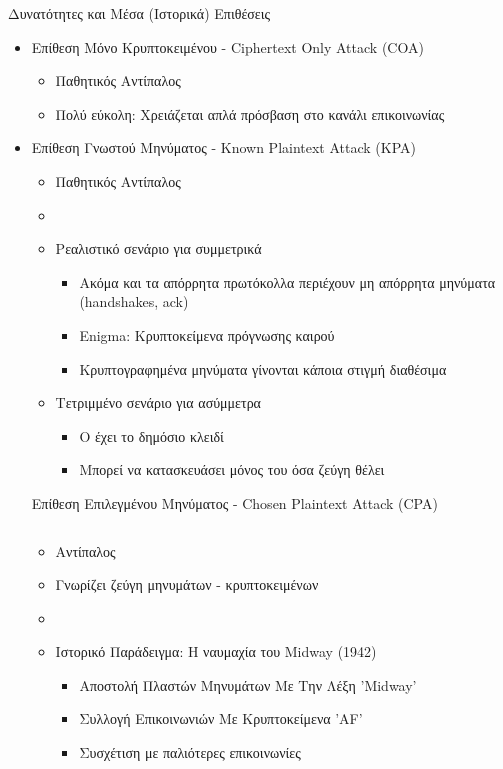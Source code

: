 \documentclass[handout]{beamer}
\begin{document}
\begin{frame}[allowframebreaks]{Δυνατότητες και Μέσα (Ιστορικά)}
Επιθέσεις
\begin{itemize}
\item Επίθεση Μόνο Κρυπτοκειμένου - Ciphertext Only Attack (COA)
\begin{itemize}
\item Παθητικός Αντίπαλος
\item Πολύ εύκολη: Χρειάζεται απλά πρόσβαση στο κανάλι επικοινωνίας
\end{itemize}
\framebreak
\item Επίθεση Γνωστού Μηνύματος -  Known Plaintext Attack (KPA)
\begin{itemize}
\item Παθητικός Αντίπαλος
\item {}
\item Ρεαλιστικό σενάριο για συμμετρικά
\begin{itemize}
\item Ακόμα και τα απόρρητα πρωτόκολλα περιέχουν μη απόρρητα μηνύματα (handshakes, ack)
\item Enigma: Κρυπτοκείμενα πρόγνωσης καιρού
\item Κρυπτογραφημένα μηνύματα γίνονται κάποια στιγμή διαθέσιμα
\end{itemize} 
\pause
\item Τετριμμένο σενάριο για ασύμμετρα
\begin{itemize}
\item O \adv έχει το δημόσιο κλειδί
\item Μπορεί να κατασκευάσει μόνος του όσα ζεύγη θέλει
\end{itemize}
\end{itemize}
\framebreak

Επίθεση Επιλεγμένου Μηνύματος - Chosen Plaintext Attack (CPA)
\begin{columns}

\begin{column}{0.65\textwidth}
\begin{itemize}
\item {} Αντίπαλος
\item Γνωρίζει ζεύγη μηνυμάτων - κρυπτοκειμένων
\pause  
\item {}
\item Ιστορικό Παράδειγμα: Η ναυμαχία του Midway (1942)
\begin{itemize}
\item Αποστολή Πλαστών Μηνυμάτων Με Την Λέξη 'Midway'
\item Συλλογή Επικοινωνιών Με Κρυπτοκείμενα 'AF'
\item Συσχέτιση με παλιότερες επικοινωνίες
\end{itemize}
\end{itemize}
\end{column}


\end{columns}
\end{itemize}
\end{frame}
\end{document}
